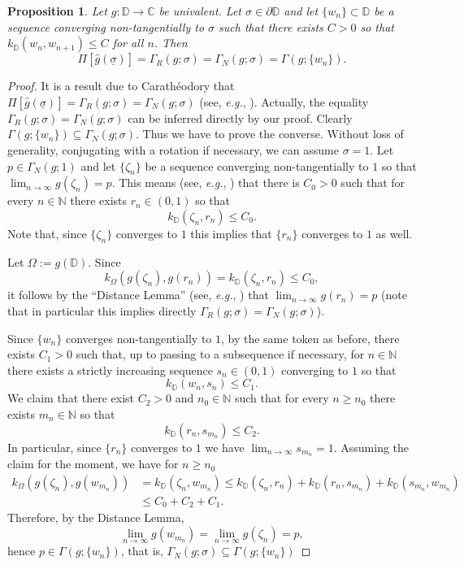 \documentclass[12pt]{amsart}
\newtheorem{proposition}[theorem]{Proposition}
\theoremstyle{definition}
\theoremstyle{remark}
\numberwithin{equation}{section}
\def\C{\mathbb C}
\def\D{\mathbb D}
\begin{document}
\begin{proposition}\label{Prop:Lehto-NT}
Let $g:\D\to \C$ be univalent. Let $\sigma\in \partial \D$ and let $\{w_n\}\subset\D$ be a sequence converging non-tangentially to $\sigma$ such that there exists $C>0$ so that $k_\D(w_n,w_{n+1})\leq C$ for all $n$. Then
\[
\Pi[\hat{g}(\underline{\sigma})]=\Gamma_{R}(g;\sigma)=\Gamma_{N}(g;\sigma)=\Gamma(g;\{w_n\}).
\]
\end{proposition}
\begin{proof}
It is a result due to Carath\'eodory that $\Pi[\hat{g}(\underline{\sigma})]=\Gamma_{R}(g;\sigma)=\Gamma_{N}(g;\sigma)$ (see, {\sl e.g.}, \cite[Theorem~4.4.9]{BCDM}). Actually, the equality $\Gamma_{R}(g;\sigma)=\Gamma_{N}(g;\sigma)$  can be inferred directly by our proof. Clearly $\Gamma(g;\{w_n\})\subseteq \Gamma_{N}(g;\sigma)$. Thus we have to prove the converse. Without loss of generality, conjugating with a rotation if necessary, we can assume $\sigma=1$. Let $p\in \Gamma_{N}(g;1)$ and let $\{\zeta_n\}$ be a sequence converging non-tangentially to $1$ so that $\lim_{n\to\infty}g(\zeta_n)=p$. This means (see, {\sl e.g.}, \cite[Corollary~6.2.6]{BCDM}) that there is $C_0>0$ such that for every $n\in\mathbb N$ there exists $r_n\in (0,1)$ so that
\[
k_\D(\zeta_n, r_n)\leq C_0.
\]
Note that, since $\{\zeta_n\}$ converges to $1$ this implies that $\{r_n\}$ converges to $1$ as well.

Let $\Omega:=g(\D)$. Since 
\[
k_\Omega(g(\zeta_n), g(r_n))=k_\D(\zeta_n, r_n)\leq C_0,
\]
it follows by the ``Distance Lemma'' (see, {\sl e.g.}, \cite[Theorem~5.3.1]{BCDM}) that $\lim_{n\to\infty} g(r_n)=p$ (note that in particular this implies directly  $\Gamma_{R}(g;\sigma)=\Gamma_{N}(g;\sigma)$). 

Since $\{w_n\}$ converges non-tangentially to $1$, by the same token as before, {there exists $C_1>0$ such that, up to passing to a subsequence if necessary, for $n\in \mathbb N$ there exists a strictly increasing sequence $s_n\in (0,1)$ converging to $1$ so that} 
\[
k_\D(w_n, s_n)\leq C_1.
\] 
We claim that there exist $C_2>0$ and $n_0\in \mathbb N$ such that for every $n\geq n_0$ there exists $m_n\in \mathbb N$ so that
\begin{equation}\label{Eq:stima-close-geo}
k_\D(r_n, s_{m_n})\leq C_2.
\end{equation}
In particular, since $\{r_n\}$ converges to $1$ we have $\lim_{n\to \infty} s_{m_n}=1$. 
Assuming the claim for the moment, we have for $n\geq n_0$
\begin{equation*}
\begin{split}
k_\Omega(g(\zeta_n), g(w_{m_n}))&=k_\D(\zeta_n, w_{m_n})\leq k_\D(\zeta_n, r_n)+k_\D(r_n, s_{m_n})+k_\D(s_{m_n}, w_{m_n})\\& \leq C_0+C_2+C_1.
\end{split}
\end{equation*}
Therefore, by the Distance Lemma, 
\[
\lim_{n\to \infty}g(w_{m_n})=\lim_{n\to \infty}g(\zeta_n)=p,
\]
hence $p\in \Gamma(g;\{w_n\})$, that is, $\Gamma_{N}(g;\sigma)\subseteq \Gamma(g;\{w_n\})$


\end{proof}
\end{document}
